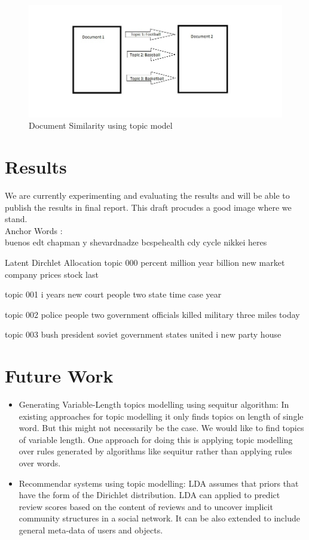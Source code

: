 \documentclass[a4paper,11pt]{article}
\begin{document}
\begin{figure}[ht!]
\centering
\includegraphics[width=180mm]{document_similarity.jpg}
\caption{Document Similarity using topic model}
\label{overflow}
\end{figure}



\section{Results}
We are currently experimenting and evaluating the results and will be able to publish the results in final report. This draft procudes a good image where we stand. \\
{\color{orange} Anchor Words : \\
buenos
edt
chapman
y
shevardnadze
bcspehealth
cdy
cycle
nikkei
heres
}
{\color{orange}
Latent Dirchlet Allocation
topic 000
   percent
   million
   year
   billion
   new
   market
   company
   prices
   stock
   last


topic 001
   i
   years
   new
   court
   people
   two
   state
   time
   case
   year


topic 002
   police
   people
   two
   government
   officials
   killed
   military
   three
   miles
   today


topic 003
   bush
   president
   soviet
   government
   states
   united
   i
   new
   party
   house
}

\section{Future Work}

\begin{itemize}

\item Generating Variable-Length topics modelling using sequitur algorithm:
	In existing approaches for topic modelling it only finds topics on length of single word. But this might not necessarily be the case. We would like to find topics of variable length. One approach for doing this is applying topic modelling over rules generated by algorithms like sequitur rather than applying rules over words.

\item Recommendar systems using topic modelling:
	LDA assumes that priors that have the form of the Dirichlet distribution. LDA can applied to predict review scores based on the content of reviews and to uncover implicit community structures in a social network. It can be also extended to include general meta-data of users and objects.

\end{itemize}
\end{document}
